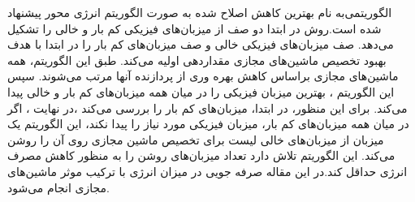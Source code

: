 الگوریتمی‌به نام  بهترین کاهش اصلاح شده 
 به صورت الگوریتم انرژی محور
 پیشنهاد شده است.روش 
 در ابتدا دو صف از میزبان‌های فیزیکی کم بار و خالی را تشکیل می‌دهد. صف میزبان‌های فیزیکی خالی و صف میزبان‌های کم بار را در ابتدا با هدف بهبود تخصیص ماشین‌های مجازی مقداردهی اولیه می‌کند. طبق این الگوریتم، همه ماشین‌های مجازی براساس کاهش بهره وری از پردازنده آنها  مرتب می‌شوند. سپس این الگوریتم ، بهترین میزبان فیزیکی را در میان همه میزبان‌های کم بار و خالی پیدا می‌کند. برای این منظور، در ابتدا، میزبان‌های کم بار را بررسی می‌کند ،در نهایت ،  اگر در میان همه میزبان‌های کم بار، میزبان فیزیکی مورد نیاز را  پیدا نکند، این الگوریتم یک میزبان از میزبان‌های خالی لیست برای تخصیص ماشین مجازی روی آن را روشن می‌کند. این الگوریتم تلاش دارد تعداد میزبان‌های روشن را به منظور کاهش مصرف انرژی حداقل کند.در این مقاله صرفه جویی در میزان انرژی با ترکیب موثر ماشین‌های مجازی انجام می‌شود. 
 \newpage
